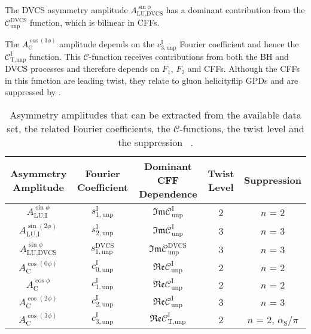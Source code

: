 The DVCS asymmetry amplitude $A^{\sin\phi}_{\textrm{LU,DVCS}}$ has a dominant
contribution from the $\mathcal{C}_{\textrm{unp}}^{\textrm{DVCS}}$ function,
which is bilinear in CFFs. 

The $A^{\cos(3\phi)}_{\textrm{C}}$ amplitude depends on the
$c_{3,\textrm{unp}}^{\textrm{I}}$ Fourier coefficient and hence the
$\mathcal{C}_{\textrm{T,unp}}^{\textrm{I}}$ function. This
$\mathcal{C}$-function receives contributions from both the BH and DVCS
processes and therefore depends on $F_{1}$, $F_{2}$ and CFFs. Although the CFFs
in this function are  leading twist, they relate to gluon helicity\blue{-}flip GPDs and are  suppressed by .
\begin{table}[H]
\begin{center}
\resizebox{16cm}{!} {
 \begin{tabular}{|c|c|c|c|c|}
\hline
Asymmetry Amplitude & Fourier Coefficient& Dominant CFF Dependence & Twist Level  & Suppression \\
\hline
\hline
$A_{\textrm{LU,I}}^{\sin\phi}$ & $s_{1,\textrm{unp}}^{\textrm{I}}$  &
$\mathfrak{Im}\mathcal{C}_{\textrm{unp}}^{\textrm{I}}$
&  2 & $n$ = 2\\
\hline
$A_{\textrm{LU,I}}^{\sin(2\phi)}$ & $s_{2,\textrm{unp}}^{\textrm{I}}$ 
&
$\mathfrak{Im}\mathcal{C}_{\textrm{unp}}^{\textrm{I}}$
&  3 & $n$ = 3\\
\hline
\hline
$A_{\textrm{LU,DVCS}}^{\sin\phi}$ & $s_{1, \textrm{unp}}^{\textrm{DVCS}}$ &
$\mathfrak{Im}\mathcal{C}_{\textrm{unp}}^{\textrm{DVCS}}$ &  3& $n$
= 3 \\
\hline
\hline
$A_{\textrm{C}}^{\cos(0\phi)}$ & $c_{0,\textrm{unp}}^{\textrm{I}}$  &
$\mathfrak{Re}\mathcal{C}_{\textrm{unp}}^{\textrm{I}}$ & 2& $n$ = 2
\\
\hline
$A_{\textrm{C}}^{\cos\phi}$ & $c_{1,\textrm{unp}}^{\textrm{I}}$  &
$\mathfrak{Re}\mathcal{C}_{\textrm{unp}}^{\textrm{I}}$ & 2 & $n$ = 2
\\
\hline
$A_{\textrm{C}}^{\cos(2\phi)}$ & $c_{2,\textrm{unp}}^{\textrm{I}}$ &
$\mathfrak{Re}\mathcal{C}_{\textrm{unp}}^{\textrm{I}}$ & 3 & $n$ = 3 \\
\hline
$A_{\textrm{C}}^{\cos(3\phi)}$ & $c_{3,\textrm{unp}}^{\textrm{I}}$ &
$\mathfrak{Re}\mathcal{C}_{\textrm{T,unp}}^{\textrm{I}}$ &  2 & $n$ = 2, $\alpha_{\textrm{S}}/\pi$ \\
\hline
 \end{tabular}
}
\caption{Asymmetry amplitudes that can
be extracted from the available data set, the related Fourier coefficients,
 the $\mathcal{C}$-functions, the twist level and the suppression ~\cite{Bel02b}.}
\label{tab_amplitudes}
\end{center}
\end{table}
 
